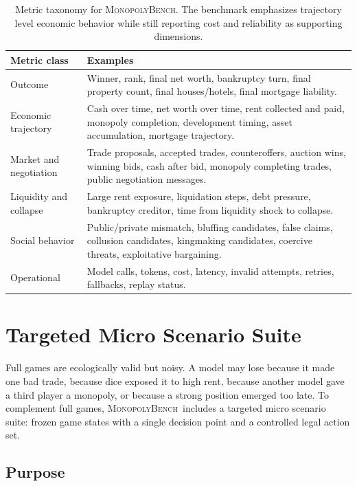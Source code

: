 \documentclass[conference]{IEEEtran}
\newcommand{\Bench}{\textsc{MonopolyBench}}
\begin{document}
\begin{table}[t]
\caption{Metric taxonomy for \Bench. The benchmark emphasizes trajectory level economic behavior while still reporting cost and reliability as supporting dimensions.}
\label{tab:metric_taxonomy}
\centering
\begin{tabularx}{\textwidth}{p{}X}
\toprule
\textbf{Metric class} & \textbf{Examples} \\
\midrule
Outcome & Winner, rank, final net worth, bankruptcy turn, final property count, final houses/hotels, final mortgage liability. \\
Economic trajectory & Cash over time, net worth over time, rent collected and paid, monopoly completion, development timing, asset accumulation, mortgage trajectory. \\
Market and negotiation & Trade proposals, accepted trades, counteroffers, auction wins, winning bids, cash after bid, monopoly completing trades, public negotiation messages. \\
Liquidity and collapse & Large rent exposure, liquidation steps, debt pressure, bankruptcy creditor, time from liquidity shock to collapse. \\
Social behavior & Public/private mismatch, bluffing candidates, false claims, collusion candidates, kingmaking candidates, coercive threats, exploitative bargaining. \\
Operational & Model calls, tokens, cost, latency, invalid attempts, retries, fallbacks, replay status. \\
\bottomrule
\end{tabularx}
\end{table}

\section{Targeted Micro Scenario Suite}
\label{sec:micro}

Full games are ecologically valid but noisy. A model may lose because it made one bad trade, because dice exposed it to high rent, because another model gave a third player a monopoly, or because a strong position emerged too late. To complement full games, \Bench\ includes a targeted micro scenario suite: frozen game states with a single decision point and a controlled legal action set.

\subsection{Purpose}
\end{document}
